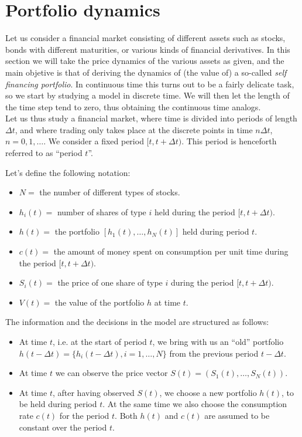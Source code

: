 \section{Portfolio dynamics} %
Let us consider a financial market consisting of different assets such as stocks, bonds with different maturities, or various kinds of financial derivatives. In this section we will take the price dynamics of the various assets as given, and the main objetive is that of deriving the dynamics of (the value of) a so-called \emph{self financing portfolio}. In continuous time this turns out to be a fairly delicate task, so we start by studying a model in discrete time. We will then let the length of the time step tend to zero, thus obtaining the continuous time analogs. \\
Let us thus study a financial market, where time is divided into periods of length $\Delta t$, and where trading only takes place at the discrete points in time $n\Delta t$, $n = 0, 1,\dots$. We consider a fixed period $[t, t + \Delta t)$. This period is henceforth referred to as “period $t$”. 
\begin{definition} Let's define the following notation:
    \begin{itemize}
    \item $N =$ the number of different types of stocks.
    \item $h_i(t) =$ number of shares of type $i$ held during the period $[t, t + \Delta t)$.
    \item $h(t) =$ the portfolio $[h_1(t),\dots,h_N(t)]$ held during period $t$.
    \item $c(t) =$ the amount of money spent on consumption per unit time during the period $[t, t + \Delta t)$.
    \item $S_i(t) =$ the price of one share of type $i$ during the period $[t, t + \Delta t)$.
    \item $V(t) =$ the value of the portfolio $h$ at time $t$.
    \end{itemize}
\end{definition}
The information and the decisions in the model are structured as follows:
\begin{itemize}
    \item At time $t$, i.e. at the start of period $t$, we bring with us an “old” portfolio $h(t - \Delta t) = \{h_i(t - \Delta t), i = 1,\dots,N\}$ from the previous period $t - \Delta t$.
    \item At time $t$ we can observe the price vector $S(t)=(S_1(t),\dots,S_N(t))$.
    \item At time $t$, after having observed $S(t)$, we choose a new portfolio $h(t)$, to be held during period $t$. At the same time we also choose the consumption rate $c(t)$ for the period $t$. Both $h(t)$ and $c(t)$ are assumed to be constant over the period $t$.
\end{itemize}
